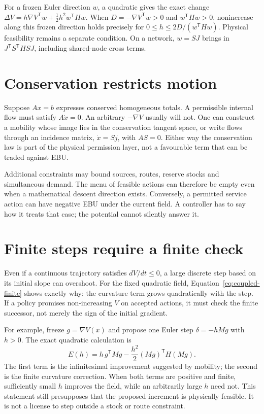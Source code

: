 For a frozen Euler direction $w$, a quadratic gives the exact change
$\Delta V=h\nabla V^{\mathsf T}w+\tfrac12h^2w^{\mathsf T}Hw$.
When $D=-\nabla V^{\mathsf T}w>0$ and $w^{\mathsf T}Hw>0$, nonincrease along this frozen direction holds precisely for $0\leq h\leq2D/(w^{\mathsf T}Hw)$. Physical feasibility remains a separate condition. On a network, $w=SJ$ brings in $J^{\mathsf T}S^{\mathsf T}HSJ$, including shared-node cross terms.

\section{Conservation restricts motion}
Suppose $A x=b$ expresses conserved homogeneous totals. A permissible internal flow must satisfy $A\dot x=0$. An arbitrary $-\nabla V$ usually will not. One can construct a mobility whose image lies in the conservation tangent space, or write flows through an incidence matrix, $\dot x=Sj$, with $AS=0$. Either way the conservation law is part of the physical permission layer, not a favourable term that can be traded against EBU.

Additional constraints may bound sources, routes, reserve stocks and simultaneous demand. The menu of feasible actions can therefore be empty even when a mathematical descent direction exists. Conversely, a permitted service action can have negative EBU under the current field. A controller has to say how it treats that case; the potential cannot silently answer it.

\section{Finite steps require a finite check}
Even if a continuous trajectory satisfies $dV/dt\leq0$, a large discrete step based on its initial slope can overshoot. For the fixed quadratic field, Equation~\ref{eq:coupled-finite} shows exactly why: the curvature term grows quadratically with the step. If a policy promises non-increasing $V$ on accepted actions, it must check the finite successor, not merely the sign of the initial gradient.

For example, freeze $g=\nabla V(x)$ and propose one Euler step $\delta=-hMg$ with $h>0$. The exact quadratic calculation is
\begin{equation}
 E(h)=h\,g^{\mathsf T}Mg-\frac{h^2}{2}(Mg)^{\mathsf T}H(Mg).
\end{equation}
The first term is the infinitesimal improvement suggested by mobility; the second is the finite curvature correction. When both terms are positive and finite, sufficiently small $h$ improves the field, while an arbitrarily large $h$ need not. This statement still presupposes that the proposed increment is physically feasible. It is not a license to step outside a stock or route constraint.

